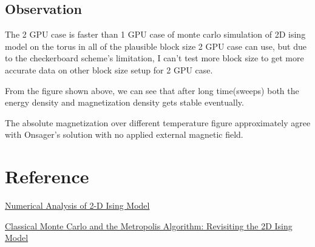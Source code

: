 \documentclass{article}
\begin{document}
	\subsection{Observation}
	The 2 GPU case is faster than 1 GPU case of monte carlo simulation of 2D ising model on the torus in all of the plausible block size 2 GPU case can use, but due to the checkerboard scheme's limitation, I can't test more block size to get more accurate data on other block size setup for 2 GPU case.
	
	From the figure shown above, we can see that after long time(sweeps) both the energy density and magnetization density gets stable eventually. 
	
	The absolute magnetization over different temperature figure approximately agree with Onsager's solution with no applied external magnetic field.
	
	\section{Reference}
	\href{https://www.hiskp.uni-bonn.de/uploads/media/ising_II.pdf}{Numerical Analysis of 2-D
		Ising Model}
	
	\href{https://phas.ubc.ca/~berciu/TEACHING/PHYS503/PROJECTS/05_dominic.pdf}{Classical Monte Carlo and the Metropolis Algorithm:
	Revisiting the 2D Ising Model}
\end{document}
